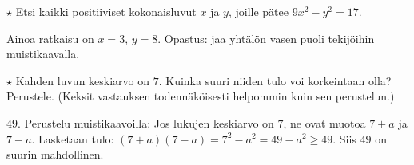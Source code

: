 \begin{tehtavasivu}
\begin{tehtava}
    $\star$ Etsi kaikki positiiviset kokonaisluvut $x$ ja $y$, joille pätee $9x^2-y^2=17$.
    \begin{vastaus}
    Ainoa ratkaisu on $x = 3$, $y=8$. Opastus: jaa yhtälön vasen puoli tekijöihin muistikaavalla. 
    \end{vastaus}
\end{tehtava}

\begin{tehtava}
    $\star$ Kahden luvun keskiarvo on $7$. Kuinka suuri niiden tulo voi korkeintaan olla? Perustele. (Keksit vastauksen todennäköisesti helpommin kuin sen perustelun.)
    \begin{vastaus}
        $49$. Perustelu muistikaavoilla: Jos lukujen keskiarvo on $7$, ne ovat muotoa $7+a$ ja $7-a$. Lasketaan tulo: $(7+a)(7-a)=7^2-a^2 = 49-a^2 \geq 49$. Siis $49$ on suurin mahdollinen.
    \end{vastaus}
\end{tehtava}

\end{tehtavasivu}